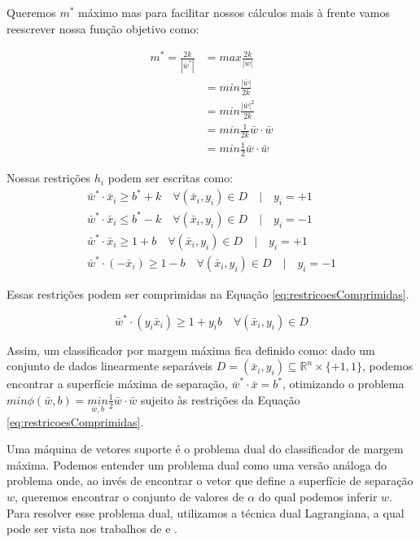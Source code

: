 Queremos $m^*$ máximo mas para facilitar nossos cálculos mais à frente vamos reescrever nossa função objetivo como:

\begin{equation}\label{eq:funcaoObjetivo}
\begin{split}
m^*=\frac{2k}{|\bar{w}^*|} &= max \frac{2k}{|\bar{w}|} \\
    &= min \frac{|\bar{w}|}{2k} \\
    &= min \frac{|\bar{w}|^2}{2k}  \\
    &= min \frac{1}{2k} \bar{w}\cdot\bar{w}  \\
    &= min \frac{1}{2} \bar{w}\cdot\bar{w}
\end{split}
\end{equation}

Nossas restrições $h_i$ podem ser escritas como:
\begin{equation}
\begin{split}
\bar{w}^*\cdot\bar{x}_i \ge b^*+k \quad \forall (\bar{x}_i,y_i)\in D \quad | \quad y_i=+1 \\
\bar{w}^*\cdot\bar{x}_i \le b^*-k \quad \forall (\bar{x}_i,y_i)\in D \quad | \quad y_i=-1 \\
\bar{w}^*\cdot\bar{x}_i \ge 1+b \quad \forall (\bar{x}_i,y_i)\in D \quad | \quad y_i=+1 \\
\bar{w}^*\cdot(-\bar{x}_i) \ge 1-b \quad \forall (\bar{x}_i,y_i)\in D \quad | \quad y_i=-1
\end{split}
\end{equation}

Essas restrições podem ser comprimidas na Equação \ref{eq:restricoesComprimidas}.

\begin{equation} \label{eq:restricoesComprimidas}
    \bar{w}^*\cdot(y_i\bar{x}_i) \ge 1+y_i b \quad \forall (\bar{x}_i,y_i)\in D
\end{equation}

Assim, um classificador por margem máxima fica definido como: dado um conjunto de dados linearmente separáveis $D=(\bar{x}_i,y_i) \subseteq \mathbb{R}^n\times\{+1,1\}$, podemos encontrar a superfície máxima de separação, $\bar{w}^*\cdot\bar{x}=b^*$, otimizando o problema $min\phi(\bar{w},b)=\underset{\bar{w},b}{min}\frac{1}{2}\bar{w}\cdot\bar{w}$ sujeito às restrições da Equação \ref{eq:restricoesComprimidas}.
\par

Uma máquina de vetores suporte é o problema dual do classificador de margem máxima. Podemos entender um problema dual como uma versão análoga do problema onde, ao invés de encontrar o vetor que define a superfície de separação $w$, queremos encontrar o conjunto de valores de $\alpha$ do qual podemos inferir $w$. Para resolver esse problema dual, utilizamos a técnica dual Lagrangiana, a qual pode ser vista nos trabalhos de \cite{art:LIVRO_SVM} e \cite{art:LIVRO_KAA}.

